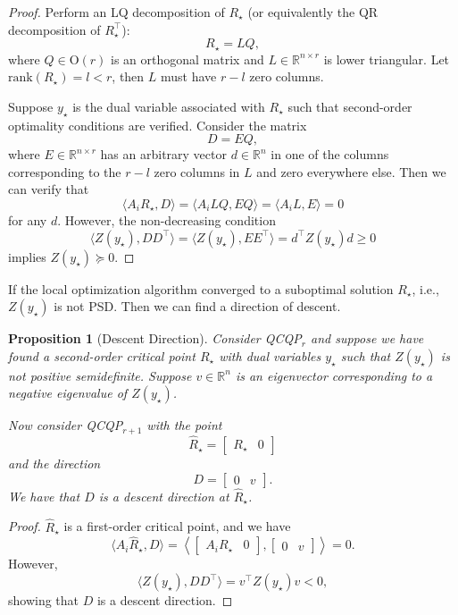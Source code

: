 \documentclass[
]{book}
\newtheorem{proposition}{Proposition}[chapter]
\theoremstyle{definition}
\theoremstyle{definition}
\theoremstyle{definition}
\theoremstyle{definition}
\theoremstyle{remark}
\begin{document}
\begin{proof}
Perform an LQ decomposition of \(R_\star\) (or equivalently the QR decomposition of \(R_\star^\top\)):
\[
R_\star = L Q, 
\]
where \(Q \in \mathrm{O}(r)\) is an orthogonal matrix and \(L \in \mathbb{R}^{n \times r}\) is lower triangular. Let \(\mathrm{rank}(R_\star) = l < r\), then \(L\) must have \(r - l\) zero columns.

Suppose \(y_\star\) is the dual variable associated with \(R_\star\) such that second-order optimality conditions are verified. Consider the matrix
\[
D = E Q,
\]
where \(E \in \mathbb{R}^{n \times r}\) has an arbitrary vector \(d \in \mathbb{R}^{n}\) in one of the columns corresponding to the \(r - l\) zero columns in \(L\) and zero everywhere else. Then we can verify that
\[
\langle A_i R_\star, D \rangle = \langle A_i L Q, E Q \rangle = \langle A_i L, E \rangle = 0
\]
for any \(d\). However, the non-decreasing condition
\[
\langle Z(y_\star), DD^\top \rangle = \langle Z(y_\star), EE^\top \rangle = d^\top Z(y_\star) d \geq 0
\]
implies \(Z(y_\star) \succeq 0\).
\end{proof}

If the local optimization algorithm converged to a suboptimal solution \(R_\star\), i.e., \(Z(y_\star)\) is not PSD. Then we can find a direction of descent.

\begin{proposition}[Descent Direction]
\protect\hypertarget{prp:DescentDirection}{}\label{prp:DescentDirection}Consider QCQP\(_r\) and suppose we have found a second-order critical point \(R_\star\) with dual variables \(y_\star\) such that \(Z(y_\star)\) is not positive semidefinite. Suppose \(v \in \mathbb{R}^{n}\) is an eigenvector corresponding to a negative eigenvalue of \(Z(y_\star)\).

Now consider QCQP\(_{r+1}\) with the point
\[
\hat{R}_{\star} = \begin{bmatrix}
R_\star & 0
\end{bmatrix}
\]
and the direction
\[
D = \begin{bmatrix}
0 & v
\end{bmatrix}.
\]
We have that \(D\) is a descent direction at \(\hat{R}_{\star}\).
\end{proposition}

\begin{proof}
\(\hat{R}_\star\) is a first-order critical point, and we have
\[
\langle A_i \hat{R}_\star, D \rangle = \left\langle \begin{bmatrix} A_i R_\star & 0 \end{bmatrix},  \begin{bmatrix} 0 & v \end{bmatrix} \right\rangle = 0.
\]
However,
\[
\langle Z(y_\star),  DD^\top \rangle = v^\top Z(y_\star) v < 0,
\]
showing that \(D\) is a descent direction.
\end{proof}
\end{document}
